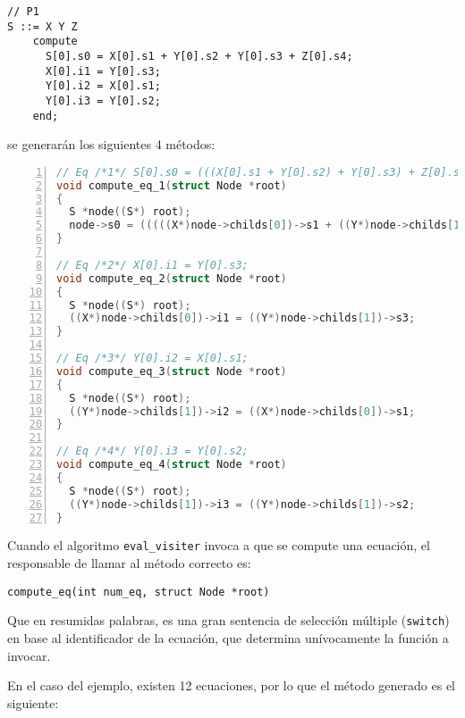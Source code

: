 \vspace*{0.2cm}
\begin{lstlisting}[language=specmag, basicstyle=\scriptsize, columns=fullflexible, linewidth=8cm]
// P1
S ::= X Y Z
    compute        
      S[0].s0 = X[0].s1 + Y[0].s2 + Y[0].s3 + Z[0].s4;
      X[0].i1 = Y[0].s3;
      Y[0].i2 = X[0].s1;
      Y[0].i3 = Y[0].s2;
    end;
\end{lstlisting}
\vspace*{0.2cm}

se generarán los siguientes 4 métodos:

\vspace*{0.2cm}
\begin{lstlisting}[language=C++, basicstyle=\scriptsize, numbers=left, columns=fullflexible]
// Eq /*1*/ S[0].s0 = (((X[0].s1 + Y[0].s2) + Y[0].s3) + Z[0].s4);
void compute_eq_1(struct Node *root)
{
  S *node((S*) root);
  node->s0 = (((((X*)node->childs[0])->s1 + ((Y*)node->childs[1])->s2) + ((Y*)node->childs[1])->s3) + ((Z*)node->childs[2])->s4);
}

// Eq /*2*/ X[0].i1 = Y[0].s3;
void compute_eq_2(struct Node *root)
{
  S *node((S*) root);
  ((X*)node->childs[0])->i1 = ((Y*)node->childs[1])->s3;
}

// Eq /*3*/ Y[0].i2 = X[0].s1;
void compute_eq_3(struct Node *root)
{
  S *node((S*) root);
  ((Y*)node->childs[1])->i2 = ((X*)node->childs[0])->s1;
}

// Eq /*4*/ Y[0].i3 = Y[0].s2;
void compute_eq_4(struct Node *root)
{
  S *node((S*) root);
  ((Y*)node->childs[1])->i3 = ((Y*)node->childs[1])->s2;
}
\end{lstlisting}
\vspace*{0.2cm}

Cuando el algoritmo \texttt{eval\_visiter} invoca a que se compute una ecuación, el responsable de llamar al método correcto es:

\begin{center}\texttt{compute\_eq(int num\_eq, struct Node *root)}\end{center}

Que en resumidas palabras, es una gran sentencia de selección múltiple (\texttt{switch}) en base al identificador de la ecuación, que determina unívocamente la función a invocar.

En el caso del ejemplo, existen 12 ecuaciones, por lo que el método generado es el siguiente:

